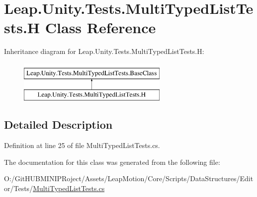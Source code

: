 \hypertarget{class_leap_1_1_unity_1_1_tests_1_1_multi_typed_list_tests_1_1_h}{}\section{Leap.\+Unity.\+Tests.\+Multi\+Typed\+List\+Tests.\+H Class Reference}
\label{class_leap_1_1_unity_1_1_tests_1_1_multi_typed_list_tests_1_1_h}
Inheritance diagram for Leap.\+Unity.\+Tests.\+Multi\+Typed\+List\+Tests.\+H\+:\begin{figure}[H]
\begin{center}
\leavevmode
\includegraphics[height=2.000000cm]{class_leap_1_1_unity_1_1_tests_1_1_multi_typed_list_tests_1_1_h}
\end{center}
\end{figure}


\subsection{Detailed Description}


Definition at line 25 of file Multi\+Typed\+List\+Tests.\+cs.



The documentation for this class was generated from the following file\+:\begin{DoxyCompactItemize}
\item 
O\+:/\+Git\+H\+U\+B\+M\+I\+N\+I\+P\+Roject/\+Assets/\+Leap\+Motion/\+Core/\+Scripts/\+Data\+Structures/\+Editor/\+Tests/\mbox{\hyperlink{_multi_typed_list_tests_8cs}{Multi\+Typed\+List\+Tests.\+cs}}\end{DoxyCompactItemize}
